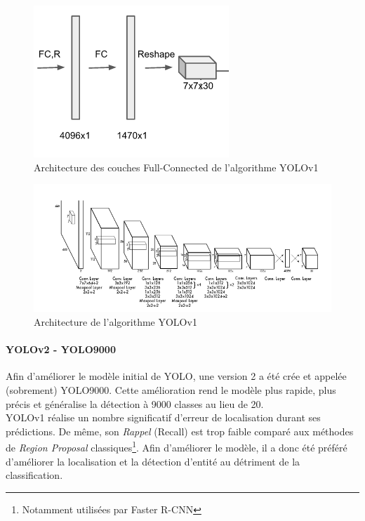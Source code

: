 \begin{figure}
\centering
\includegraphics[scale=0.4]{./tex/computer-vision/sota/yolov12.png}
\caption{Architecture des couches Full-Connected de l'algorithme YOLOv1}
\label{yolov12}
\end{figure}

\begin{figure}
\centering
\includegraphics[scale=0.6]{./tex/computer-vision/sota/yolov1rez.png}
\caption{Architecture de l'algorithme YOLOv1}
\label{yolov1re}
\end{figure}

\paragraph{YOLOv2 - YOLO9000}
Afin d'améliorer le modèle initial de YOLO, une version 2 a été crée et appelée (sobrement) YOLO9000\cite{yolov2_deep}. Cette amélioration rend le modèle plus rapide, plus précis et généralise la détection à 9000 classes au lieu de 20.\\

\noindent YOLOv1 réalise un nombre significatif d'erreur de localisation durant ses prédictions. De même, son \textit{Rappel} (Recall) est trop faible comparé aux méthodes de \textit{Region Proposal} classiques\footnote{Notamment utilisées par Faster R-CNN}. Afin d'améliorer le modèle, il a donc été préféré d'améliorer la localisation et la détection d'entité au détriment de la classification.\\

